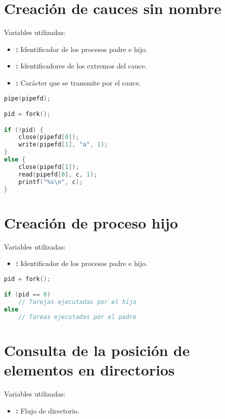 \pagebreak

\section{Creación de cauces sin nombre}

Variables utilizadas:

\begin{itemize}
	\item{}\textbf{:} Identificador de los procesos padre e hijo.
	\item{}\textbf{:} Identificadores de los extremos del cauce.
	\item{}\textbf{:} Carácter que se transmite por el cauce.
\end{itemize}

\begin{lstlisting}[language=C]
pipe(pipefd);

pid = fork();

if (!pid) {
	close(pipefd[0]);
	write(pipefd[1], "a", 1);
}
else {
	close(pipefd[1]);
	read(pipefd[0], c, 1);
	printf("%s\n", c);
}
\end{lstlisting}

\section{Creación de proceso hijo}

Variables utilizadas:

\begin{itemize}
	\item{}\textbf{:} Identificador de los procesos padre e hijo.
\end{itemize}

\begin{lstlisting}[language=C]
pid = fork();

if (pid == 0)
	// Tarejas ejecutadas por el hijo
else
	// Tareas ejecutadas por el padre
\end{lstlisting}

\section{Consulta de la posición de elementos en directorios}

Variables utilizadas:

\begin{itemize}
	\item{}\textbf{:} Flujo de directorio.
\end{itemize}

